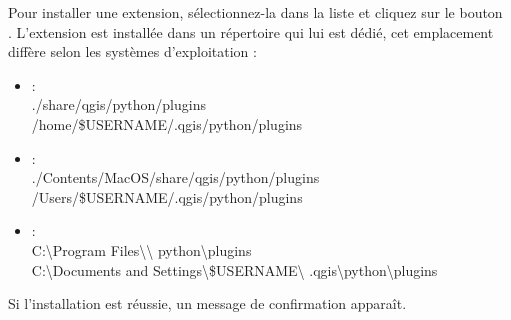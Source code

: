 
Pour installer une extension, sélectionnez-la dans la liste et cliquez sur le 
bouton\\ . L'extension est installée dans un 
répertoire qui lui est dédié, cet emplacement diffère selon les systèmes 
d'exploitation :

\begin{itemize}[label=--]
\item {} :\\
./share/qgis/python/plugins \\
/home/\$USERNAME/.qgis/python/plugins
\item {} :\\
./Contents/MacOS/share/qgis/python/plugins \\
/Users/\$USERNAME/.qgis/python/plugins
\item {} :\\
C:\textbackslash Program Files\textbackslash \qg\textbackslash
python\textbackslash plugins \\
C:\textbackslash Documents and Settings\textbackslash\$USERNAME\textbackslash
.qgis\textbackslash python\textbackslash plugins
\end{itemize}

Si l'installation est réussie, un message de confirmation apparaît.


